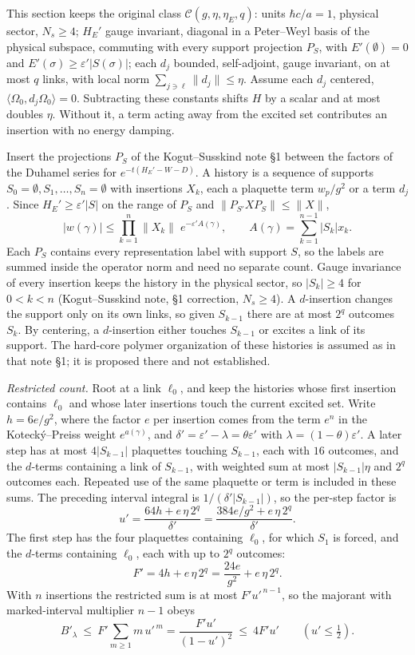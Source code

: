 \documentclass[11pt,a4paper]{article}
\begin{document}
This section keeps the original class \(\mathcal C(g,\eta,\eta_E,q)\):
units \(\hbar c/a=1\), physical sector, \(N_s\ge4\); \(H_E'\) gauge
invariant, diagonal in a Peter--Weyl basis of the physical subspace,
commuting with every support projection \(P_S\), with
\(E'(\emptyset)=0\) and \(E'(\sigma)\ge\varepsilon'|S(\sigma)|\); each
\(d_j\) bounded, self-adjoint, gauge invariant, on at most \(q\) links,
with local norm \(\sum_{j\ni\ell}\|d_j\|\le\eta\). Assume each \(d_j\)
centered, \(\langle\Omega_0,d_j\Omega_0\rangle=0\). Subtracting these
constants shifts \(H\) by a scalar and at most doubles \(\eta\). Without
it, a term acting away from the excited set contributes an insertion
with no energy damping.

Insert the projections \(P_S\) of the Kogut--Susskind note §1 between
the factors of the Duhamel series for \(e^{-t(H_E'-W-D)}\). A history is
a sequence of supports \(S_0=\emptyset,S_1,\dots,S_n=\emptyset\) with
insertions \(X_k\), each a plaquette term \(w_p/g^2\) or a term \(d_j\).
Since \(H_E'\ge\varepsilon'|S|\) on the range of \(P_S\) and
\(\|P_{S'}XP_S\|\le\|X\|\),
\[|w(\gamma)|\le\prod_{k=1}^n\|X_k\|\;e^{-\varepsilon'A(\gamma)},\qquad
A(\gamma)=\sum_{k=1}^{n-1}|S_k|x_k .\] Each \(P_S\) contains every
representation label with support \(S\), so the labels are summed inside
the operator norm and need no separate count. Gauge invariance of every
insertion keeps the history in the physical sector, so \(|S_k|\ge4\) for
\(0<k<n\) (Kogut--Susskind note, §1 correction, \(N_s\ge4\)). A
\(d\)-insertion changes the support only on its own links, so given
\(S_{k-1}\) there are at most \(2^q\) outcomes \(S_k\). By centering, a
\(d\)-insertion either touches \(S_{k-1}\) or excites a link of its
support. The hard-core polymer organization of these histories is
assumed as in that note §1; it is proposed there and not established.

\emph{Restricted count.} Root at a link \(\ell_0\), and keep the
histories whose first insertion contains \(\ell_0\) and whose later
insertions touch the current excited set. Write \(h=6e/g^2\), where the
factor \(e\) per insertion comes from the term \(e^{n}\) in the
Kotecký--Preiss weight \(e^{a(\gamma)}\), and
\(\delta'=\varepsilon'-\lambda=\theta\varepsilon'\) with
\(\lambda=(1-\theta)\varepsilon'\). A later step has at most
\(4|S_{k-1}|\) plaquettes touching \(S_{k-1}\), each with \(16\)
outcomes, and the \(d\)-terms containing a link of \(S_{k-1}\), with
weighted sum at most \(|S_{k-1}|\eta\) and \(2^q\) outcomes each.
Repeated use of the same plaquette or term is included in these sums.
The preceding interval integral is \(1/(\delta'|S_{k-1}|)\), so the
per-step factor is
\[u'=\frac{64h+e\,\eta\,2^q}{\delta'}=\frac{384e/g^2+e\,\eta\,2^q}{\delta'} .\]
The first step has the four plaquettes containing \(\ell_0\), for which
\(S_1\) is forced, and the \(d\)-terms containing \(\ell_0\), each with
up to \(2^q\) outcomes:
\[F'=4h+e\,\eta\,2^q=\frac{24e}{g^2}+e\,\eta\,2^q .\] With \(n\)
insertions the restricted sum is at most \(F'u'^{\,n-1}\), so the
majorant with marked-interval multiplier \(n-1\) obeys
\[B'_\lambda\ \le\ F'\sum_{m\ge1}m\,u'^{\,m}=\frac{F'u'}{(1-u')^2}\ \le\ 4F'u'
\qquad(u'\le\tfrac12).\]
\end{document}
